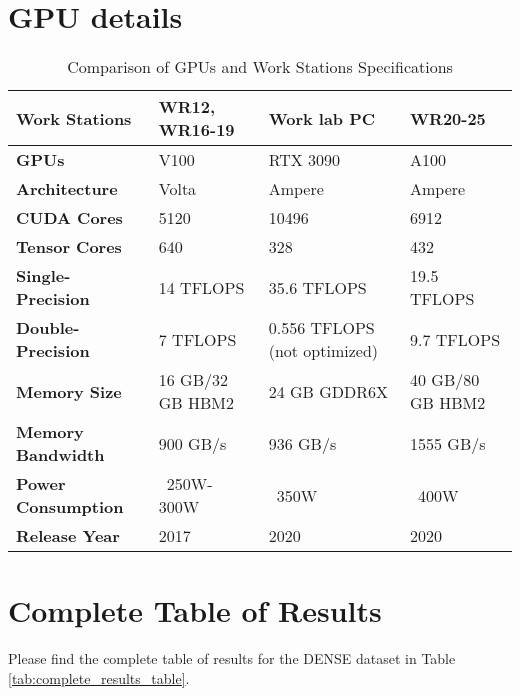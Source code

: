 \documentclass[report.tex]{subfiles}
\begin{document}
    \chapter{GPU details}
    \label{appendix:gpu_details}

    \begin{table}[h]
        \centering
        \caption{Comparison of GPUs and Work Stations Specifications}
        \begin{tabular}{|l|l|l|l|}
        \hline
        \textbf{Work Stations} & \textbf{WR12, WR16-19} & \textbf{Work lab PC} & \textbf{WR20-25} \\ \hline
        \textbf{GPUs} & V100 & RTX 3090 & A100 \\ \hline
        \textbf{Architecture} & Volta & Ampere & Ampere \\ \hline
        \textbf{CUDA Cores} & 5120 & 10496 & 6912 \\ \hline
        \textbf{Tensor Cores} & 640 & 328 & 432 \\ \hline
        \textbf{Single-Precision} & 14 TFLOPS & 35.6 TFLOPS & 19.5 TFLOPS \\ \hline
        \textbf{Double-Precision} & 7 TFLOPS & 0.556 TFLOPS (not optimized) & 9.7 TFLOPS \\ \hline
        \textbf{Memory Size} & 16 GB/32 GB HBM2 & 24 GB GDDR6X & 40 GB/80 GB HBM2 \\ \hline
        \textbf{Memory Bandwidth} & 900 GB/s & 936 GB/s & 1555 GB/s \\ \hline
        \textbf{Power Consumption} & ~250W-300W & ~350W & ~400W \\ \hline
        \textbf{Release Year} & 2017 & 2020 & 2020 \\ \hline
        \end{tabular}
        
        \label{tab:gpu_comparison}
    \end{table}
    
    


    \chapter{Complete Table of Results}

    Please find the complete table of results for the DENSE dataset in Table \ref{tab:complete_results_table}.
\end{document}
